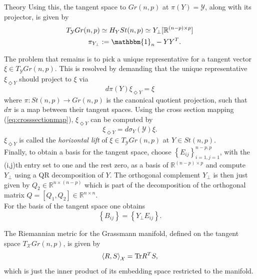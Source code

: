 \begin{chapter}{Theory}
Using this, the tangent space to $Gr(n,p)$ at $\pi(Y)=\mathcal{Y}$, along with its projector, is given by 
\begin{align}
    \label{eq:grassmann_tangentspace}
    T_{\mathcal{Y}}Gr(n,p)&\simeq  H_YSt(n,p)\simeq Y_{\bot}[\mathbb{R}^{(n-p)\times p}]\\
    \pi_{Y_{\bot}}&:=\mathbbm{1}_n-YY^T.
\end{align}

The problem that remains is to pick a unique representative for a tangent vector $\xi\in T_{\mathcal{Y}}Gr(n,p)$.
This is resolved by demanding that the unique representative $\xi_{\Diamond Y}$ should project to $\xi$ via
\begin{equation}
d\pi(Y)\xi_{\Diamond Y}=\xi
\end{equation}
where $\pi: St(n,p)\to Gr(n,p)$ is the canonical quotient projection, such that $d\pi$ is a map between their 
tangent spaces. Using the cross section mapping (\ref{eq:crosssectionmap}), $\xi_{\Diamond Y}$ can be computed by
\begin{equation}
\xi_{\Diamond Y} = d\sigma_Y(\mathcal{Y})\xi.
\end{equation}
$\xi_{\Diamond Y}$ is called the \emph{horizontal lift} of $\xi\in T_{\mathcal{Y}}Gr(n,p)$ at $Y\in St(n,p)$.\\

Finally, to obtain a basis for the tangent space, choose $\left\lbrace E_{ij}\right\rbrace_{i=1,j=1}^{n-p,p}$, with the (i,j)th entry set to one and the rest zero,
as a basis of $\mathbb{R}^{(n-p)\times p}$ and compute $Y_{\bot}$ using a QR decomposition of $Y$. The orthogonal complement $Y_{\bot}$ is then just given by 
$Q_2\in\mathbb{R}^{n\times (n-p)}$ which is part of the decomposition of the orthogonal matrix $Q=[Q_1,Q_2]\in\mathbb{R}^{n\times n}$.\\
For the basis of the tangent space one obtains
\begin{equation}
    \left\lbrace B_{ij}\right\rbrace=\left\lbrace Y_{\bot}E_{ij}\right\rbrace.
\end{equation}

The Riemannian metric for the Grassmann manifold, defined on the tangent space $T_{\mathcal{X}}Gr(n,p)$, is given by 
\begin{equation}
\label{eq:grassmann_metric}
    \left\langle R,S \right\rangle_\mathcal{X} = \textnormal{Tr} R^TS,
\end{equation}
which is just the inner product of its embedding space restricted to the manifold.


\end{chapter}

